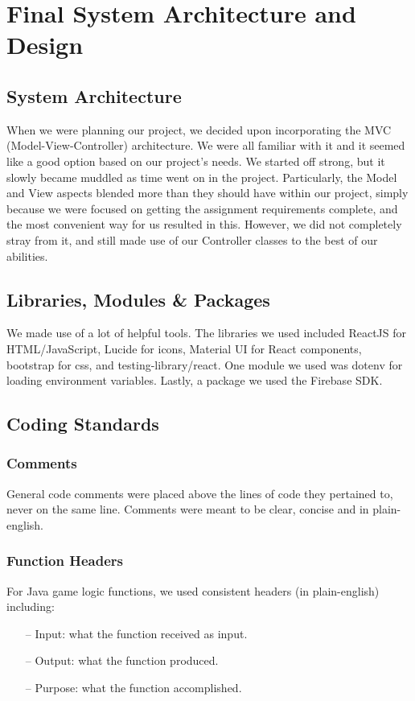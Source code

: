 \section{Final System Architecture and Design}

\subsection{System Architecture}
When we were planning our project, we decided upon incorporating the MVC (Model-View-Controller) architecture. We were all familiar with it and it seemed like a good option based on our project's needs. We started off strong, but it slowly became muddled as time went on in the project. Particularly, the Model and View aspects blended more than they should have within our project, simply because we were focused on getting the assignment requirements complete, and the most convenient way for us resulted in this. However, we did not completely stray from it, and still made use of our Controller classes to the best of our abilities.

\subsection{Libraries, Modules \& Packages}
\label{sec:libs/mods/packs}
We made use of a lot of helpful tools. The libraries we used included ReactJS for HTML/JavaScript, Lucide for icons, Material UI for React components, bootstrap for css, and testing-library/react. One module we used was dotenv for loading environment variables.
Lastly, a package we used the Firebase SDK.

\subsection{Coding Standards}
\subsubsection{Comments}
General code comments were placed above the lines of code they pertained to, never on the same line. Comments were meant to be clear, concise and in plain-english.

\subsubsection{Function Headers}
For Java game logic functions, we used consistent headers (in plain-english) including:
\begin{itemize}
    \item [--] Input: what the function received as input.
    \item [--] Output: what the function produced.
    \item [--] Purpose: what the function accomplished.
\end{itemize}

